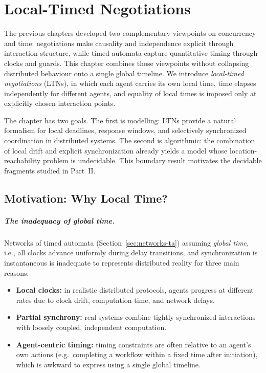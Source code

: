 
\chapter{Local-Timed Negotiations}
\label{chap:ltn}

The previous chapters developed two complementary viewpoints on concurrency and
time: negotiations make causality and independence explicit through interaction
structure, while timed automata capture quantitative timing through clocks and
guards.  This chapter combines those viewpoints without collapsing distributed
behaviour onto a single global timeline.  We introduce \emph{local-timed
negotiations} (LTNs), in which each agent carries its own local time, time
elapses independently for different agents, and equality of local times is
imposed only at explicitly chosen interaction points.

The chapter has two goals. The first is modelling: LTNs provide a natural
formalism for local deadlines, response windows, and selectively synchronized
coordination in distributed systems.  The second is algorithmic: the combination
of local drift and explicit synchronization already yields a model whose
location-reachability problem is undecidable.  This boundary result motivates
the decidable fragments studied in Part~II.

\section{Motivation: Why Local Time?}

\paragraph{The inadequacy of global time.} Networks of timed automata (Section~\ref{sec:networks-ta}) assuming \emph{global time}, i.e., all clocks advance uniformly during delay transitions, and synchronization is instantaneous is inadequate to represents distributed reality for three main reasons:

\begin{itemize}
  \item \textbf{Local clocks:} in realistic distributed protocols, agents progress
        at different rates due to clock drift, computation time, and network
        delays.
  \item \textbf{Partial synchrony:} real systems combine tightly synchronized
        interactions with loosely coupled, independent computation.
  \item \textbf{Agent-centric timing:} timing constraints are often relative to an
        agent’s own actions (e.g.\ completing a workflow within a fixed time after
        initiation), which is awkward to express using a single global timeline.
\end{itemize}

